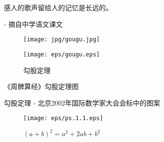 \documentclass[main.tex]{subfiles}
\begin{document}
\begin{flushright}
	\begin{kaishu}
		感人的歌声留给人的记忆是长远的。\\
	\end{kaishu}
	- 摘自中学语文课文
\end{flushright}

\begin{figure}[h]
\centering
\begin{minipage}{.45\textwidth}
	\centering
	\texttt{[image: jpg/gougu.jpg]}
\end{minipage}
\begin{minipage}{.45\textwidth}
	\centering
	\texttt{[image: eps/gougu.eps]}
\end{minipage}
\caption{勾股定理}
 \label{fig:1.5.1}
\end{figure}	

{《周髀算经》勾股定理图}

勾股定理 - 北京2002年国际数学家大会会标中的图案
\begin{figure}[h]
	\centering
	\texttt{[image: eps/ps.1.1.eps]}
	\caption{$(a+b)^2 = a^2 + 2ab + b^2$}
	\label{fig:chap1.5.3}
\end{figure}	
\end{document}
